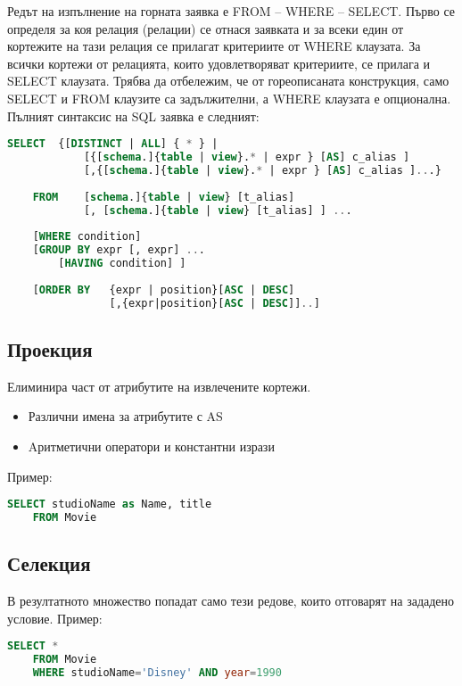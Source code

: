 Редът на изпълнение на горната заявка е FROM – WHERE – SELECT. Първо се определя за коя релация (релации) 
се отнася заявката и за всеки един от кортежите на тази релация се прилагат критериите от WHERE клаузата. 
За всички кортежи от релацията, които удовлетворяват критериите, се прилага и SELECT клаузата. 
Трябва да отбележим, че от гореописаната конструкция, само SELECT и FROM клаузите са задължителни, а 
WHERE клаузата е опционална.\newline
Пълният синтаксис на SQL заявка е следният:

\begin{lstlisting}[language=SQL]
    SELECT  {[DISTINCT | ALL] { * } |
            [{[schema.]{table | view}.* | expr } [AS] c_alias ]
            [,{[schema.]{table | view}.* | expr } [AS] c_alias ]...}
    
    FROM    [schema.]{table | view} [t_alias]
            [, [schema.]{table | view} [t_alias] ] ...
    
    [WHERE condition]
    [GROUP BY expr [, expr] ...
        [HAVING condition] ]
    
    [ORDER BY   {expr | position}[ASC | DESC]
                [,{expr|position}[ASC | DESC]]..]
\end{lstlisting}

\subsection{Проекция}
Елиминира част от атрибутите на извлечените кортежи.
\begin{itemize}
    \item Различни имена за атрибутите с AS
    \item Aритметични оператори и константни изрази
\end{itemize}
Пример:
\begin{lstlisting}[language=SQL]
    SELECT studioName as Name, title
    FROM Movie
\end{lstlisting}

\subsection{Селекция}
В резултатното множество попадат само тези редове, които отговарят на зададено условие.\newline
Пример:
\begin{lstlisting}[language=SQL]
    SELECT *
    FROM Movie
    WHERE studioName='Disney' AND year=1990
\end{lstlisting}

